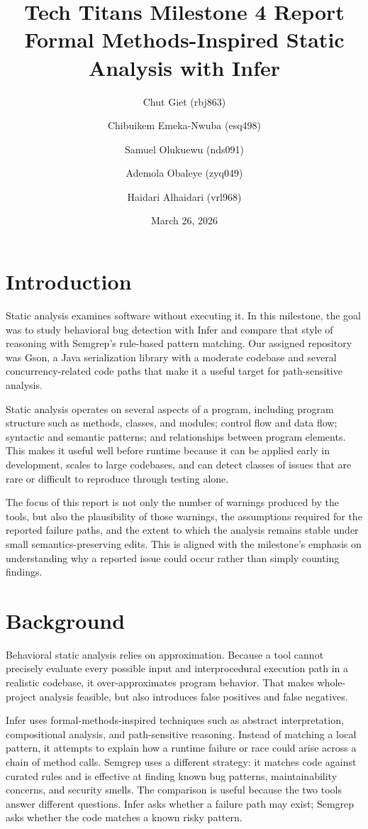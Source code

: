 \documentclass[11pt]{article}
\title{\textbf{Tech Titans Milestone 4 Report}\\Formal Methods-Inspired Static Analysis with Infer}
\author{
Chut Giet (rbj863) \and
Chibuikem Emeka-Nwuba (esq498) \and
Samuel Olukuewu (nds091) \and
Ademola Obaleye (zyq049) \and
Haidari Alhaidari (vrl968)
}
\date{March 26, 2026}
\begin{document}
\maketitle

\section{Introduction}
Static analysis examines software without executing it. In this milestone, the goal was to study behavioral bug detection with Infer and compare that style of reasoning with Semgrep's rule-based pattern matching. Our assigned repository was Gson, a Java serialization library with a moderate codebase and several concurrency-related code paths that make it a useful target for path-sensitive analysis.

Static analysis operates on several aspects of a program, including program structure such as methods, classes, and modules; control flow and data flow; syntactic and semantic patterns; and relationships between program elements. This makes it useful well before runtime because it can be applied early in development, scales to large codebases, and can detect classes of issues that are rare or difficult to reproduce through testing alone.

The focus of this report is not only the number of warnings produced by the tools, but also the plausibility of those warnings, the assumptions required for the reported failure paths, and the extent to which the analysis remains stable under small semantics-preserving edits. This is aligned with the milestone's emphasis on understanding why a reported issue could occur rather than simply counting findings.

\section{Background}
Behavioral static analysis relies on approximation. Because a tool cannot precisely evaluate every possible input and interprocedural execution path in a realistic codebase, it over-approximates program behavior. That makes whole-project analysis feasible, but also introduces false positives and false negatives.

Infer uses formal-methods-inspired techniques such as abstract interpretation, compositional analysis, and path-sensitive reasoning. Instead of matching a local pattern, it attempts to explain how a runtime failure or race could arise across a chain of method calls. Semgrep uses a different strategy: it matches code against curated rules and is effective at finding known bug patterns, maintainability concerns, and security smells. The comparison is useful because the two tools answer different questions. Infer asks whether a failure path may exist; Semgrep asks whether the code matches a known risky pattern.
\end{document}

